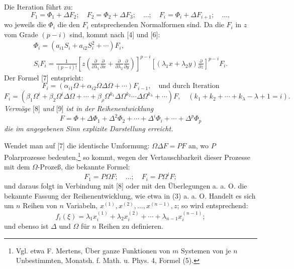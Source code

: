 \documentclass[11pt]{article}
\providecommand{\p}{\partial}
\begin{document}
Die Iteration führt zu:
\[
        F_1=\Phi_1+\Delta F_2;\quad F_2=\Phi_2+\Delta F_3;\quad\ldots;\quad
        F_i=\Phi_i+\Delta F_{i+1};\quad\ldots,
\]
wo jeweils die $\Phi_i$ die den $F_i$ entsprechenden Normalformen sind. Da die $F_i$ in $z$ vom Grade $(p-i)$ sind, kommt nach [4] und [6]:
\begin{equation}
\begin{gathered}
        \Phi_i=(a_{i1}S_i+a_{i2}S_i^2+\cdots)F_i,\\
        S_iF_i=\frac1{(p-i)!}
        \left[z\left(\frac{\p}{\p\lambda_1}\frac{\p}{\p x}+
        \frac{\p}{\p\lambda_2}\frac{\p}{\p y}\right)\right]^{p-i}
        \left[(\lambda_1x+\lambda_2y)\frac{\p}{\p z}\right]^{p-i}F_i.
\end{gathered}
\tag{8}
\end{equation}
Der Formel [7] entspricht:
\[
        F_i=(\alpha_{i1}\Omega+\alpha_{i2}\Omega\Delta\Omega+\cdots)F_{i-1},
        \quad\text{und durch Iteration}
\]
\begin{equation}
        F_i=(\beta_1\Omega^i+\beta_2\Omega^i\Delta\Omega+\cdots
        +\beta_\rho\Omega^{k_1}\Delta\Omega^{k_2}\cdots\Delta\Omega^{k_\lambda}+\cdots)F,
        \quad(k_1+k_2+\cdots+k_\lambda-\lambda+1=i).
\tag{9}
\end{equation}
\emph{Vermöge} [8] \emph{und} [9] \emph{ist in der Reihenentwicklung}
\[
        F=\Phi+\Delta\Phi_1+\Delta^2\Phi_2+\cdots+\Delta^i\Phi_i+\cdots+\Delta^p\Phi_p
\]
\emph{die im angegebenen Sinn explizite Darstellung erreicht.}

Wendet man auf [7] die identische Umformung: $\Omega\Delta F=PF$ an, wo $P$ Polarprozesse bedeuten,\footnote{Vgl. etwa F. Mertens, Über ganze Funktionen von $m$ Systemen von je $n$ Unbestimmten, Monatsh. f. Math. u. Phys. 4, Formel (5).} so kommt, wegen der Vertauschbarkeit dieser Prozesse mit dem $\Omega$-Prozeß, die bekannte Formel:
\[
        F_1=P\Omega F;\quad\ldots;\quad F_i=P\Omega^iF;
\]
und daraus folgt in Verbindung mit [8] oder mit den Überlegungen a. a. O. die bekannte Fassung der Reihenentwicklung, wie etwa in (3) a. a. O. Handelt es sich um $n$ Reihen von $n$ Variabeln, $x^{(1)},x^{(2)},\ldots,x^{(n-1)},z$; so wird entsprechend:
\[
        f_i(\xi)=\lambda_1x_i^{(1)}+\lambda_2x_i^{(2)}+\cdots+\lambda_{n-1}x_i^{(n-1)};
\]
und ebenso ist $\Delta$ und $\Omega$ für $n$ Reihen zu definieren.
\end{document}
